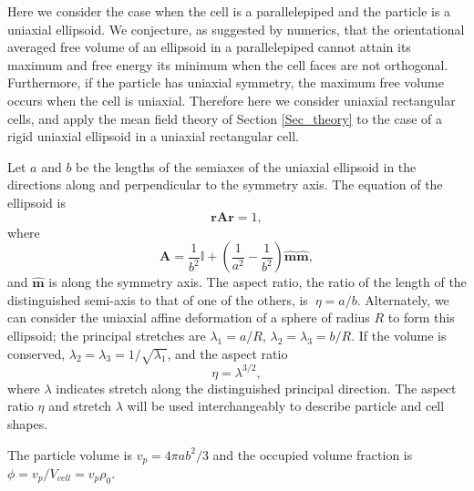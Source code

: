 \documentclass{article}
\begin{document}
\label{Sec_free_vol}

Here we consider the case when the cell is a parallelepiped and the particle
is a uniaxial ellipsoid. We conjecture, as suggested by numerics, that the
orientational averaged free volume of an ellipsoid in a parallelepiped
cannot attain its maximum and free energy its minimum when the cell faces
are not orthogonal. Furthermore, if the particle has uniaxial symmetry, the
maximum free volume occurs when the cell is uniaxial. Therefore here we
consider uniaxial rectangular cells, and apply the mean field theory of
Section \ref{Sec_theory} to the case of a rigid uniaxial ellipsoid in a
uniaxial rectangular cell.

Let $a$ and $b$ be the lengths of the semiaxes of the uniaxial ellipsoid in
the directions along and perpendicular to the symmetry axis. The equation of
the ellipsoid is 
\begin{equation}
\mathbf{rAr}=1,
\end{equation}%
where%
\begin{equation}
\mathbf{A}=\frac{1}{b^{2}}\mathbb{I}+(\frac{1}{a^{2}}-\frac{1}{b^{2}})%
\mathbf{\hat{m}\hat{m},}
\end{equation}%
and $\mathbf{\hat{m}}$ is along the symmetry axis. The aspect ratio, the
ratio of the length of the distinguished semi-axis to that of one of the
others, is $\ \eta =a/b$. Alternately, we can consider the uniaxial affine
deformation of a sphere of radius $R$ to form this ellipsoid; the principal
stretches are $\lambda _{1}=a/R$, $\lambda _{2}=\lambda _{3}=b/R$. If the
volume is conserved, $\lambda _{2}=\lambda _{3}=1/\sqrt{\lambda _{1}}$, and
the aspect ratio 
\begin{equation}
\eta =\lambda ^{3/2},
\end{equation}%
where $\lambda$ indicates stretch along the distinguished principal
direction. The aspect ratio $\eta$ and stretch $\lambda $ will be used
interchangeably to describe particle and cell shapes.

The particle volume is $v_{p}=4\pi ab^{2}/3$ and the occupied volume
fraction is $\phi =v_{p}/V_{cell}=v_{p}\rho _{0}$.
\end{document}
